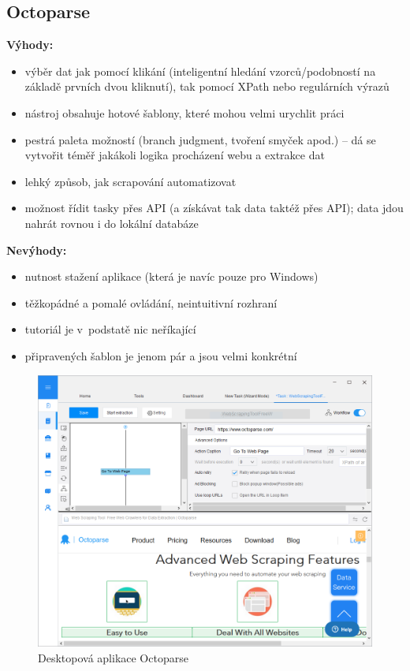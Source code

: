 \documentclass[thesis=B,czech]{FITthesis}[2012/06/26]
\begin{document}
\subsection{Octoparse}
\textbf{Výhody:}
\begin{itemize}
	\item výběr dat jak pomocí klikání (inteligentní hledání vzorců/podobností na základě prvních dvou kliknutí), tak pomocí XPath nebo regulárních výrazů
	\item nástroj obsahuje hotové šablony, které mohou velmi urychlit práci
	\item pestrá paleta možností (branch judgment, tvoření smyček apod.) -- dá se vytvořit téměř jakákoli logika procházení webu a extrakce dat
	\item lehký způsob, jak scrapování automatizovat
	\item možnost řídit tasky přes API (a získávat tak data taktéž přes API); data jdou nahrát rovnou i do lokální databáze
\end{itemize}
\textbf{Nevýhody:}
\begin{itemize}
	\item nutnost stažení aplikace (která je navíc pouze pro Windows)
	\item těžkopádné a pomalé ovládání, neintuitivní rozhraní
	\item tutoriál je v~podstatě nic neříkající
	\item připravených šablon je jenom pár a jsou velmi konkrétní
\end{itemize}
\begin{figure}[h]
	\includegraphics[width=\linewidth]{images/Octoparse.png}
	\caption{Desktopová aplikace Octoparse\cite[snímek pořídil autor]{octoparse}}
	\label{fig:octoparse}
\end{figure}
\end{document}
